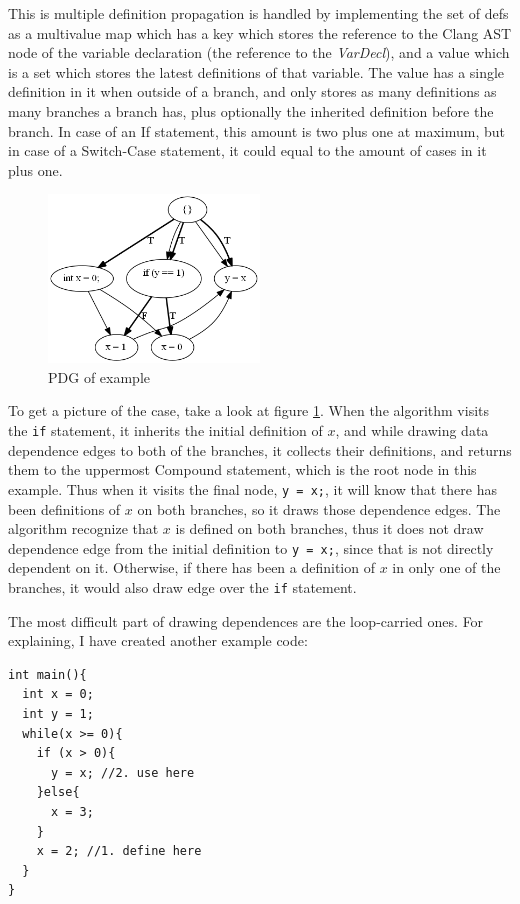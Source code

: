 \documentclass[oneside,12pt,a4paper]{book}
\begin{document}
This is multiple definition propagation is handled by implementing the set of defs as a multivalue map which has a key which stores the reference to the Clang AST node of the variable declaration (the reference to the \textit{VarDecl}), and a value which is a set which stores the latest definitions of that variable. The value has a single definition in it when outside of a branch, and only stores as many definitions as many branches a branch has, plus optionally the inherited definition before the branch. In case of an If statement, this amount is two plus one at maximum, but in case of a Switch-Case statement, it could equal to the amount of cases in it plus one. 
\clearpage
\begin{figure}
\includegraphics[width=0.5\textwidth]{if_test}
\caption{PDG of example}
\label{fig:if_test}
\end{figure}
To get a picture of the case, take a look at figure \ref{fig:if_test}. When the algorithm visits the \texttt{if} statement, it inherits the initial definition of $x$, and while drawing data dependence edges to both of the branches, it collects their definitions, and returns them to the uppermost Compound statement, which is the root node in this example. Thus when it visits the final node, \texttt{y = x;}, it will know that there has been definitions of $x$ on both branches, so it draws those dependence edges. The algorithm recognize that $x$ is defined on both branches, thus it does not draw dependence edge from the initial definition to \texttt{y = x;}, since that is not directly dependent on it. Otherwise, if there has been a definition of $x$ in only one of the branches, it would also draw edge over the \texttt{if} statement. 

The most difficult part of drawing dependences are the loop-carried ones. For explaining, I have created another example code:
\begin{lstlisting}
int main(){
  int x = 0;
  int y = 1;
  while(x >= 0){
    if (x > 0){
      y = x; //2. use here 
    }else{
      x = 3;
    }
    x = 2; //1. define here
  }
}
\end{lstlisting}
\end{document}
